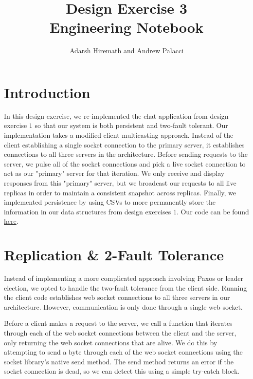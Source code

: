 \documentclass[
	a4paper, %
	10pt, %
	unnumberedsections, %
	twoside, %
]{LTJournalArticle}
\title{Design Exercise 3\\ Engineering Notebook} %
\author{%
	Adarsh Hiremath and Andrew Palacci
}
\begin{document}
\maketitle %


\section{Introduction}
In this design exercise, we re-implemented the chat application from design exercise $1$ so that our system is both persistent and two-fault tolerant. Our implementation takes a modified client multicasting approach. Instead of the client establishing a single socket connection to the primary server, it establishes connections to all three servers in the architecture. Before sending requests to the server, we pulse all of the socket connections and pick a live socket connection to act as our "primary" server for that iteration. We only receive and display responses from this "primary" server, but we broadcast our requests to all live replicas in order to maintain a consistent snapshot across replicas. Finally, we implemented persistence by using CSVs to more permanently store the information in our data structures from design exercises $1$. Our code can be found \href{https://github.com/andrewp2303/replication}{here}. 

\section{Replication \& 2-Fault Tolerance}

Instead of implementing a more complicated approach involving Paxos or leader election, we opted to handle the two-fault tolerance from the client side. Running the client code establishes web socket connections to all three servers in our architecture. However, communication is only done through a single web socket. 

Before a client makes a request to the server, we call a function that iterates through each of the web socket connections between the client and the server, only returning the web socket connections that are alive. We do this by attempting to send a byte through each of the web socket connections using the socket library's native send method. The send method returns an error if the socket connection is dead, so we can detect this using a simple try-catch block.
\end{document}
